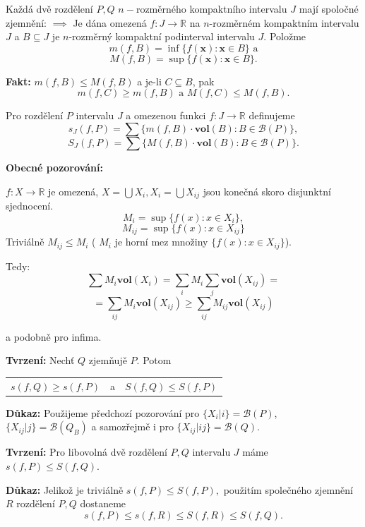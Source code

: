 \documentclass[10pt]{article}
\begin{document}
Každá dvě rozdělení $P,Q$ $n-$rozměrného kompaktního intervalu $J$ mají spoločné zjemnění:
\vspace{5mm}
\noindent
\textbf{$\implies$} Je dána omezená $f: J \rightarrow \mathbb{R}$ na $n$-rozměrném kompaktním intervalu $J$ a $B \subseteq J$ je 
$n$-rozměrný kompaktní podinterval intervalu $J$. Položme
\[m(f,B) = \inf\{f(\textbf{x}) : \textbf{x} \in B\} \text{ a}\]
\[M(f,B) = \sup\{f(\textbf{x}) : \textbf{x} \in B\}.\]

\textbf{Fakt:} $m(f,B) \leq M(f,B)$ a je-li $C \subseteq B$, pak 
\[m(f,C) \geq m(f,B) \text{ a } M(f,C) \leq M(f,B).\]

Pro rozdělení $P$ intervalu $J$ a omezenou funkci $f : J \rightarrow \mathbb{R}$ definujeme 
\[s_J(f,P) = \sum \{m(f,B) \cdot \textbf{vol}(B) : B \in \mathcal{B}(P)\},\]
\[S_J(f,P) = \sum \{M(f,B) \cdot \textbf{vol}(B) : B \in \mathcal{B}(P)\}.\]

\textbf{Obecné pozorování:}

$f: X \rightarrow \mathbb{R}$ je omezená, $X = \bigcup X_i, X_i = \bigcup X_{ij}$ jsou konečná skoro disjunktní sjednocení.
\[M_i = \sup\{f(x) : x \in X_i\},\]
\[M_{ij} = \sup\{f(x) : x \in X_{ij}\}\]
\newpage
Triviálně $M_{ij} \leq M_i$ ( $M_i$ je horní mez množiny $\{f(x) : x \in X_{ij}\}$).

Tedy:
\[\sum M_i \textbf{vol}(X_i) = \sum_i M_i \sum_j \textbf{vol}(X_{ij}) = \]
\[= \sum_{ij}M_i \textbf{vol}(X_{ij}) \geq \sum_{ij} M_{ij} \textbf{vol}(X_{ij})\]

a podobně pro infima.

\textbf{Tvrzení:} Nechť $Q$ zjemňujě $P$. Potom
\begin{center}
    \begin{tabular}{c c c}
        $s(f,Q) \geq s(f,P)$ & a & $S(f,Q) \leq S(f,P)$
    \end{tabular}
\end{center}

\vspace{5mm}
\noindent
\textbf{Důkaz:} Použijeme předchozí pozorování pro $\{X_i | i\} = \mathcal{B}(P)$, $\{X_{ij} | j\} = \mathcal{B}(Q_B)$ a samozřejmě
i pro $\{X_{ij} | ij\} = \mathcal{B}(Q).$

\textbf{Tvrzení:} Pro libovolná dvě rozdělení $P,Q$ intervalu $J$ máme $s(f,P) \leq S(f,Q)$.

\vspace{5mm}
\noindent
\textbf{Důkaz:} Jelikož je triviálně $s(f,P) \leq S(f,P),$ použitím společného zjemnění $R$ rozdělení $P,Q$ dostaneme
\[s(f,P) \leq s(f,R) \leq S(f,R) \leq S(f,Q).\]
\end{document}
